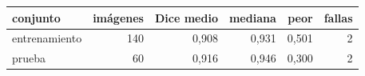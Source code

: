 \begin{tabular}{lrrrrr}
\toprule
conjunto & imágenes & Dice medio & mediana & peor & fallas \\
\midrule
entrenamiento & 140 & 0{,}908 & 0{,}931 & 0{,}501 & 2 \\
prueba & 60 & 0{,}916 & 0{,}946 & 0{,}300 & 2 \\
\bottomrule
\end{tabular}
